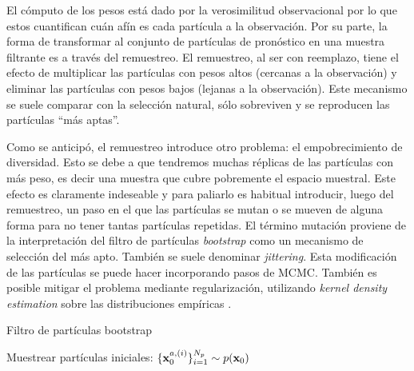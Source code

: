 El cómputo de los pesos está dado por la verosimilitud observacional por lo que estos cuantifican cuán afín es cada partícula a la observación. Por su parte, la forma de transformar al conjunto de partículas de pronóstico en una muestra filtrante es a través del remuestreo. El remuestreo, al ser con reemplazo, tiene el efecto de multiplicar las partículas con pesos altos (cercanas a la observación) y eliminar las partículas con pesos bajos (lejanas a la observación). Este mecanismo se suele comparar con la selección natural, sólo sobreviven y se reproducen las partículas ``más aptas''.

Como se anticipó, el remuestreo introduce otro problema: el empobrecimiento de diversidad. Esto se debe a que tendremos muchas réplicas de las partículas con más peso, es decir una muestra que cubre pobremente el espacio muestral. Este efecto es claramente indeseable y para paliarlo es habitual introducir, luego del remuestreo, un paso en el que las partículas se mutan o se mueven de alguna forma para no tener tantas partículas repetidas. El término mutación proviene de la interpretación del filtro de partículas \textit{bootstrap} como un mecanismo de selección del más apto. También se suele denominar \textit{jittering}. Esta modificación de las partículas se puede hacer incorporando pasos de MCMC. También es posible mitigar el problema mediante regularización, utilizando \textit{kernel density estimation} sobre las distribuciones empíricas \citep{Sarkka2013, Arulampalam2002, Ruchi2019}.

\begin{algorithm}[h]
\caption{Filtro de partículas bootstrap}
\label{algo:bootstrap_pf}
    Muestrear partículas iniciales: $\{\mathbf{x}_0^{a, (i)}\}_{i=1}^{N_p} \sim p(\mathbf{x}_0)$
    
\end{algorithm}

